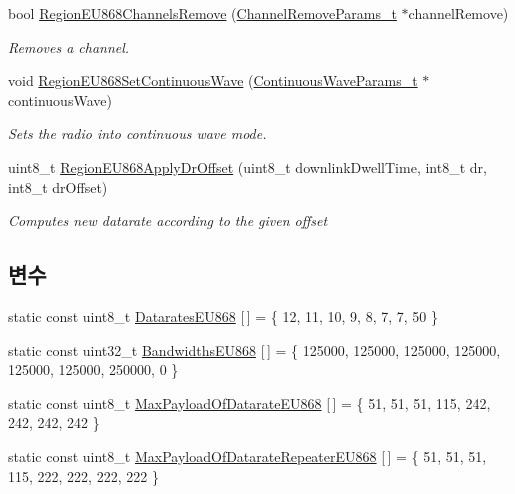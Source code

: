 \begin{DoxyCompactItemize}
bool \mbox{\hyperlink{group___r_e_g_i_o_n_e_u868_gac30e0032ee1e6f09d4ee032e7169e238}{Region\+E\+U868\+Channels\+Remove}} (\mbox{\hyperlink{group___r_e_g_i_o_n_gaa37468560d2fc81a977b57a48e5d72c0}{Channel\+Remove\+Params\+\_\+t}} $\ast$channel\+Remove)
\begin{DoxyCompactList}\small\item\em Removes a channel. \end{DoxyCompactList}\item 
void \mbox{\hyperlink{group___r_e_g_i_o_n_e_u868_gaa7573d0677552b321af04417a58672eb}{Region\+E\+U868\+Set\+Continuous\+Wave}} (\mbox{\hyperlink{group___r_e_g_i_o_n_gaf39bb5ba06921139c6d17f88a8d518cd}{Continuous\+Wave\+Params\+\_\+t}} $\ast$continuous\+Wave)
\begin{DoxyCompactList}\small\item\em Sets the radio into continuous wave mode. \end{DoxyCompactList}\item 
uint8\+\_\+t \mbox{\hyperlink{group___r_e_g_i_o_n_e_u868_ga30121c63a197681a176717191a4b89cd}{Region\+E\+U868\+Apply\+Dr\+Offset}} (uint8\+\_\+t downlink\+Dwell\+Time, int8\+\_\+t dr, int8\+\_\+t dr\+Offset)
\begin{DoxyCompactList}\small\item\em Computes new datarate according to the given offset \end{DoxyCompactList}\end{DoxyCompactItemize}
\subsection*{변수}
\begin{DoxyCompactItemize}
\item 
static const uint8\+\_\+t \mbox{\hyperlink{group___r_e_g_i_o_n_e_u868_gaacd1013fb42b2c19f701b3540798f690}{Datarates\+E\+U868}} \mbox{[}$\,$\mbox{]} = \{ 12, 11, 10, 9, 8, 7, 7, 50 \}
\item 
static const uint32\+\_\+t \mbox{\hyperlink{group___r_e_g_i_o_n_e_u868_gaa5abb02aef836d84ef991986d9b1d9e1}{Bandwidths\+E\+U868}} \mbox{[}$\,$\mbox{]} = \{ 125000, 125000, 125000, 125000, 125000, 125000, 250000, 0 \}
\item 
static const uint8\+\_\+t \mbox{\hyperlink{group___r_e_g_i_o_n_e_u868_gac370ccd4a63001a3b9dcfeac869fbbb2}{Max\+Payload\+Of\+Datarate\+E\+U868}} \mbox{[}$\,$\mbox{]} = \{ 51, 51, 51, 115, 242, 242, 242, 242 \}
\item 
static const uint8\+\_\+t \mbox{\hyperlink{group___r_e_g_i_o_n_e_u868_ga1d8f4e80003a6ff84006b0082f310f5a}{Max\+Payload\+Of\+Datarate\+Repeater\+E\+U868}} \mbox{[}$\,$\mbox{]} = \{ 51, 51, 51, 115, 222, 222, 222, 222 \}
\end{DoxyCompactItemize}


